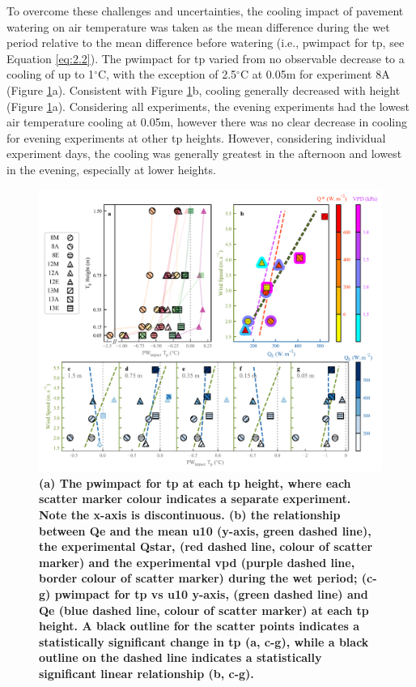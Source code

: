 \documentclass[final,3p,times,authoryear]{elsarticle}
\begin{document}
To overcome these challenges and uncertainties, the cooling impact of pavement watering on air temperature was taken as the mean difference during the wet period relative to the mean difference before watering (i.e., \gls{pwimpact} for \gls{tp}, see Equation \ref{eq:2.2}). The \gls{pwimpact} for \gls{tp} varied from no observable decrease to a cooling of up to 1$^{\circ}$C, with the exception of 2.5$^{\circ}$C at 0.05m for experiment 8A (Figure \ref{fig:3.3}a). Consistent with Figure \ref{fig:3.3}b, cooling generally decreased with height (Figure \ref{fig:3.3}a). Considering all experiments, the evening experiments had the lowest air temperature cooling at 0.05m, however there was no clear decrease in cooling for evening experiments at other \gls{tp} heights. However, considering individual experiment days, the cooling was generally greatest in the afternoon and lowest in the evening, especially at lower heights.

\begin{figure}
\centering
\includegraphics[trim={0 0 0 0},clip,scale=1.0]{pict014.png}
\caption{\bf (a) The \gls{pwimpact} for \gls{tp} at each \gls{tp} height, where each scatter marker colour indicates a separate experiment. Note the x-axis is discontinuous. (b) the relationship between \gls{Qe} and the mean \gls{u10} (y-axis, green dashed line), the experimental \gls{Qstar}, (red dashed line, colour of scatter marker) and the experimental \gls{vpd} (purple dashed line, border colour of scatter marker) during the wet period; (c-g) \gls{pwimpact} for \gls{tp} vs \gls{u10} y-axis, (green dashed line) and \gls{Qe} (blue dashed line, colour of scatter marker) at each \gls{tp} height. A black outline for the scatter points indicates a statistically significant change in \gls{tp} (a, c-g), while a black outline on the dashed line indicates a statistically significant linear relationship (b, c-g).}
 \label{fig:3.3}
\end{figure}
\end{document}
